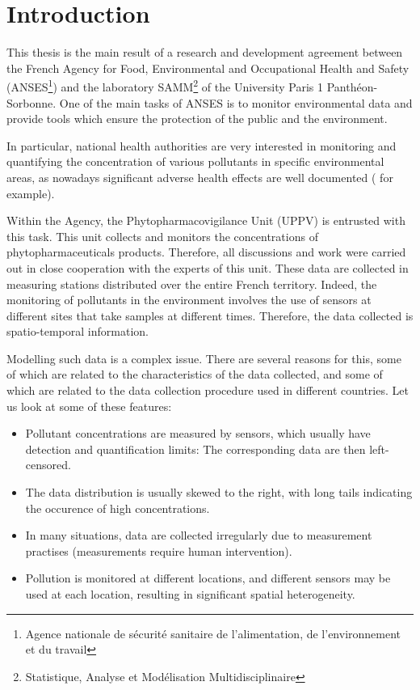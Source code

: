 \chapter{Introduction}\label{chp:1}

This thesis is the main result of a research and development agreement between the French Agency for Food, Environmental and Occupational Health and Safety (ANSES\footnote{Agence nationale de sécurité sanitaire de l'alimentation, de l'environnement et du travail}) and the laboratory SAMM\footnote{Statistique, Analyse et Modélisation Multidisciplinaire} of the University Paris 1 Panthéon-Sorbonne. One of the main tasks of ANSES is to monitor environmental data and provide tools which ensure the protection of the public and the environment.

In particular, national health authorities are very interested in monitoring and quantifying the concentration of various pollutants in specific environmental areas, as nowadays significant adverse health effects are well documented (\cite{khopkar2007,Marchant2018,NOUGADERE201432} for example). 

Within the Agency, the Phytopharmacovigilance Unit (UPPV) is entrusted with this task. This unit collects and monitors the concentrations of phytopharmaceuticals products. Therefore, all discussions and work were carried out in close cooperation with the experts of this unit. These data are collected in measuring stations distributed over the entire French territory. Indeed, the monitoring of pollutants in the environment involves the use of sensors at different sites that take samples at different times. Therefore, the data collected is spatio-temporal information. 


Modelling such data is a complex issue. There are several reasons for this, some of which are related to the characteristics of the data collected, and some of which are related to the data collection procedure used in different countries.
Let us look at some of these features:
\begin{itemize}
\item Pollutant concentrations are measured by sensors, which usually have detection and quantification limits: The corresponding data are then left-censored.
\item The data distribution is usually skewed to the right, with long tails indicating the occurence of high concentrations.
\item In many situations, data are collected irregularly due to measurement practises (measurements require human intervention).
\item Pollution is monitored at different locations, and different sensors may be used at each location, resulting in significant spatial heterogeneity.
\end{itemize}

